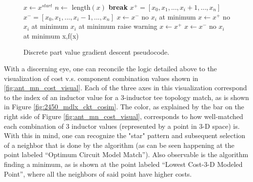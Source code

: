 \documentclass[12pt]{usfcoe}
\begin{document}
	\begin{figure}
    \begin{center}
    \begin{minipage}{.8\linewidth}
    \begin{algorithmic}[1]
        
        \State $x \gets x^{start}$ %
        \State $n \gets$ length$(x)$
                    \textbf{break}
                \EndIf
                \State $ x^{+} = [x_0,x_1,...,x_i + 1,...,x_n] $
                \State $ x^{-} = [x_0,x_1,...,x_i - 1,...,x_n] $
                    \State $x \gets x^{-}$
                    \State no $x_i$ at minimum
                    \State $x \gets x^{+}$
                    \State no $x_i$ at minimum
                    \State $x_i $ at minimum
                    \State raise warning %
                        \State $x \gets x^{+}$
                        \State $x \gets x^{-}$
                    \EndIf 
                    \State no $x_i$ at minimum
                \EndIf 
            \EndFor
        \EndWhile
        \Return x,f(x)
    
        \caption{Discrete part value gradient descent pseudocode.}
        \end{algorithmic}
        \end{minipage}
        \end{center}
        \label{fig:pseudocode}
    \end{figure}
    \pagebreak

    With a discerning eye, one can reconcile the logic detailed above to the visualization of cost v.s. component combination values shown in \ref{fig:ant_mn_cost_visual}. 
    Each of the three axes in this visualization correspond to the index of an inductor value for a 3-inductor tee topology match, as is shown in Figure \ref{fig:2450_mdlx_ckt_cosim}. 
    The color, as explained by the bar on the right side of Figure \ref{fig:ant_mn_cost_visual}, corresponds to how well-matched each combination of 3 inductor values (represented by a point in 3-D space) is. 
    With this in mind, one can recognize the "star" pattern and subsequent selection of a neighbor that is done by the algorithm (as can be seen happening at the point labeled ``Optimum Circuit Model Match'').
    Also observable is the algorithm finding a minimum, as is shown at the point labeled ``Lowest Cost-3-D Modeled Point'', where all the neighbors of said point have higher costs. 
    
\end{document}
